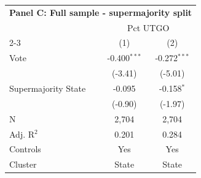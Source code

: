 \begingroup
\centering
\begin{tabular*}{\textwidth}{@{\extracolsep{\fill}}lcc}
\multicolumn{5}{l}{\textbf{Panel C: Full sample - supermajority split}}\\

\addlinespace
   \toprule
    & \multicolumn{2}{c}{Pct UTGO}\\
   \cmidrule(lr){2-3}
                       & (1)            & (2)\\  
   \midrule 
   Vote                & -0.400$^{***}$ & -0.272$^{***}$\\   
                       & (-3.41)       & (-5.01)\\   
   Supermajority State & -0.095         & -0.158$^{*}$\\   
                       & (-0.90)       & (-1.97)\\   
   \hline
   N        & 2,704          & 2,704\\  
   Adj. R$^2$      & 0.201          & 0.284\\  
   Controls                   & Yes            & Yes\\
   Cluster              & State & State\\  
   \bottomrule
\end{tabular*}
\par\endgroup
